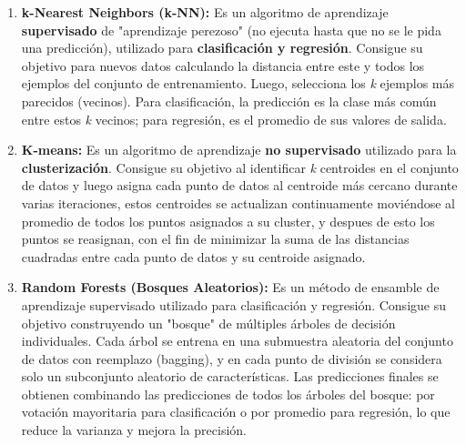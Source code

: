 \begin{enumerate}
\begin{enumerate}
\begin{enumerate}
		\item \textbf{k-Nearest Neighbors (k-NN):}
		Es un algoritmo de aprendizaje \textbf{supervisado} de "aprendizaje perezoso" (no ejecuta hasta que no se le pida una predicción), utilizado para \textbf{clasificación y regresión}. Consigue su objetivo para nuevos datos calculando la distancia entre este y todos los ejemplos del conjunto de entrenamiento. Luego, selecciona los \emph{k} ejemplos más parecidos (vecinos). Para clasificación, la predicción es la clase más común entre estos \emph{k} vecinos; para regresión, es el promedio de sus valores de salida.
		
		\item \textbf{K-means:}
		Es un algoritmo de aprendizaje \textbf{no supervisado} utilizado para la \textbf{clusterización}. Consigue su objetivo al identificar \emph{k} centroides en el conjunto de datos y luego asigna cada punto de datos al centroide más cercano durante varias iteraciones, estos centroides se actualizan continuamente moviéndose al promedio de todos los puntos asignados a su cluster, y despues de esto los puntos se reasignan, con el fin de minimizar la suma de las distancias cuadradas entre cada punto de datos y su centroide asignado.
		
		\item \textbf{Random Forests (Bosques Aleatorios):}
		Es un método de ensamble de aprendizaje supervisado utilizado para clasificación y regresión. Consigue su objetivo construyendo un "bosque" de múltiples árboles de decisión individuales. Cada árbol se entrena en una submuestra aleatoria del conjunto de datos con reemplazo (bagging), y en cada punto de división se considera solo un subconjunto aleatorio de características. Las predicciones finales se obtienen combinando las predicciones de todos los árboles del bosque: por votación mayoritaria para clasificación o por promedio para regresión, lo que reduce la varianza y mejora la precisión.
		

\end{enumerate}
\end{enumerate}
\end{enumerate}
